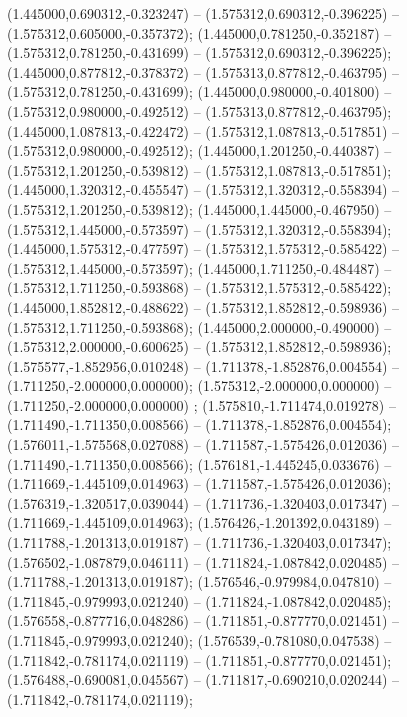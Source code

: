  (1.445000,0.690312,-0.323247) -- (1.575312,0.690312,-0.396225) -- (1.575312,0.605000,-0.357372);
 (1.445000,0.781250,-0.352187) -- (1.575312,0.781250,-0.431699) -- (1.575312,0.690312,-0.396225);
 (1.445000,0.877812,-0.378372) -- (1.575313,0.877812,-0.463795) -- (1.575312,0.781250,-0.431699);
 (1.445000,0.980000,-0.401800) -- (1.575312,0.980000,-0.492512) -- (1.575313,0.877812,-0.463795);
 (1.445000,1.087813,-0.422472) -- (1.575312,1.087813,-0.517851) -- (1.575312,0.980000,-0.492512);
 (1.445000,1.201250,-0.440387) -- (1.575312,1.201250,-0.539812) -- (1.575312,1.087813,-0.517851);
 (1.445000,1.320312,-0.455547) -- (1.575312,1.320312,-0.558394) -- (1.575312,1.201250,-0.539812);
 (1.445000,1.445000,-0.467950) -- (1.575312,1.445000,-0.573597) -- (1.575312,1.320312,-0.558394);
 (1.445000,1.575312,-0.477597) -- (1.575312,1.575312,-0.585422) -- (1.575312,1.445000,-0.573597);
 (1.445000,1.711250,-0.484487) -- (1.575312,1.711250,-0.593868) -- (1.575312,1.575312,-0.585422);
 (1.445000,1.852812,-0.488622) -- (1.575312,1.852812,-0.598936) -- (1.575312,1.711250,-0.593868);
 (1.445000,2.000000,-0.490000) -- (1.575312,2.000000,-0.600625) -- (1.575312,1.852812,-0.598936);
 (1.575577,-1.852956,0.010248) -- (1.711378,-1.852876,0.004554) -- (1.711250,-2.000000,0.000000);
 (1.575312,-2.000000,0.000000) -- (1.711250,-2.000000,0.000000) ;
 (1.575810,-1.711474,0.019278) -- (1.711490,-1.711350,0.008566) -- (1.711378,-1.852876,0.004554);
 (1.576011,-1.575568,0.027088) -- (1.711587,-1.575426,0.012036) -- (1.711490,-1.711350,0.008566);
 (1.576181,-1.445245,0.033676) -- (1.711669,-1.445109,0.014963) -- (1.711587,-1.575426,0.012036);
 (1.576319,-1.320517,0.039044) -- (1.711736,-1.320403,0.017347) -- (1.711669,-1.445109,0.014963);
 (1.576426,-1.201392,0.043189) -- (1.711788,-1.201313,0.019187) -- (1.711736,-1.320403,0.017347);
 (1.576502,-1.087879,0.046111) -- (1.711824,-1.087842,0.020485) -- (1.711788,-1.201313,0.019187);
 (1.576546,-0.979984,0.047810) -- (1.711845,-0.979993,0.021240) -- (1.711824,-1.087842,0.020485);
 (1.576558,-0.877716,0.048286) -- (1.711851,-0.877770,0.021451) -- (1.711845,-0.979993,0.021240);
 (1.576539,-0.781080,0.047538) -- (1.711842,-0.781174,0.021119) -- (1.711851,-0.877770,0.021451);
 (1.576488,-0.690081,0.045567) -- (1.711817,-0.690210,0.020244) -- (1.711842,-0.781174,0.021119);

